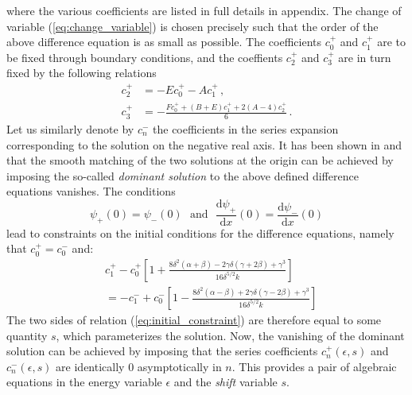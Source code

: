 \documentclass[reprint, amsmath, amssymb, aps, prl]{revtex4-2}
\begin{document}
    where the various coefficients are listed in full details in appendix. The change of variable (\ref{eq:change_variable}) is chosen precisely such that the order of the above difference equation is as small as possible. The coefficients $c^+_0$ and $c^+_1$ are to be fixed through boundary conditions, and the coeffients $c^+_2$ and $c^+_3$ are in turn fixed by the following relations
    \begin{equation}
    \begin{split}
        c^+_2&=-Ec^+_0-Ac^+_1\,,\\
        c^+_3&=-\frac{ F c^+_0+(B+E)c^+_1 +2 (A-4)c^+_2 }{6}\,.
    \end{split}
    \end{equation}
    Let us similarly denote by $c^-_n$ the coefficients in the series expansion corresponding to the solution on the negative real axis. It has been shown in \cite{Lay_1998} and \cite{doi:10.1063/1.531962} that the smooth matching of the two solutions at the origin can be achieved by imposing the so-called \textit{dominant solution} to the above defined difference equations vanishes. The conditions
    \begin{equation}
        \psi_+(0) = \psi_-(0)\ \ \ \text{and}\ \ \ \frac{\text{d}\psi_+}{\text{d}x}(0) = \frac{\text{d}\psi_-}{\text{d}x}(0)
    \end{equation}
    lead to constraints on the initial conditions for the difference equations, namely that $c^+_0 = c^-_0$ and:
    \begin{equation}
    \label{eq:initial_constraint}
    \begin{split}
        &c^+_1-c^+_0 \left[1+\frac{8 \delta ^2 (\alpha +\beta )-2 \gamma  \delta  (\gamma+2 \beta )+\gamma ^3}{16 \delta ^{5/2} k}\right]\\
        & = -c^-_1+c^-_0 \left[1-\frac{8 \delta ^2 (\alpha -\beta )+2 \gamma  \delta  (\gamma -2 \beta )+\gamma ^3}{16 \delta ^{5/2} k}\right]
    \end{split}
    \end{equation}
    The two sides of relation (\ref{eq:initial_constraint}) are therefore equal to some quantity $s$, which parameterizes the solution. Now, the vanishing of the dominant solution can be achieved by imposing that the series coefficients $c^+_n(\epsilon, s)$ and $c^-_n(\epsilon, s)$ are identically $0$ asymptotically in $n$. This provides a pair of algebraic equations in the energy variable $\epsilon$ and the \textit{shift} variable $s$.
\end{document}
